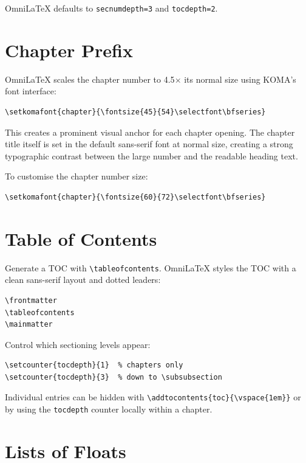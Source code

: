 OmniLaTeX defaults to \texttt{secnumdepth=3} and \texttt{tocdepth=2}.

\section{Chapter Prefix}

OmniLaTeX scales the chapter number to 4.5$\times$ its normal size using
KOMA's font interface:

\begin{verbatim}
\setkomafont{chapter}{\fontsize{45}{54}\selectfont\bfseries}
\end{verbatim}

This creates a prominent visual anchor for each chapter opening.  The
chapter title itself is set in the default sans-serif font at normal size,
creating a strong typographic contrast between the large number and the
readable heading text.

To customise the chapter number size:

\begin{verbatim}
\setkomafont{chapter}{\fontsize{60}{72}\selectfont\bfseries}
\end{verbatim}

\section{Table of Contents}

Generate a TOC with \verb|\tableofcontents|.  OmniLaTeX styles the TOC
with a clean sans-serif layout and dotted leaders:

\begin{verbatim}
\frontmatter
\tableofcontents
\mainmatter
\end{verbatim}

Control which sectioning levels appear:

\begin{verbatim}
\setcounter{tocdepth}{1}  % chapters only
\setcounter{tocdepth}{3}  % down to \subsubsection
\end{verbatim}

Individual entries can be hidden with \verb|\addtocontents{toc}{\vspace{1em}}|
or by using the \texttt{tocdepth} counter locally within a chapter.

\section{Lists of Floats}

